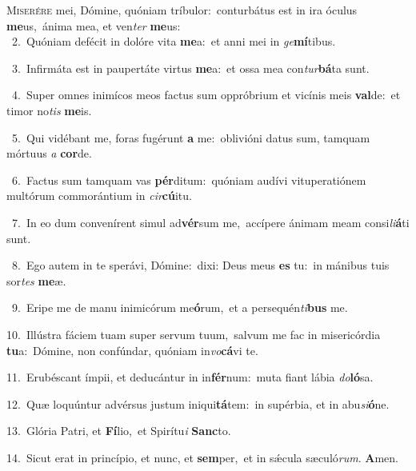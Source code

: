 \lettrine{\initial\textcolor{\initialcolor}{M}}{iserére} mei, Dómine, quóniam tríbulor:~\dagger conturbátus est in ira óculus \textbf{me}\-us,~\star ánima mea, et ven\textit{ter} \textbf{me}\-us:\\
{\numbfont\textcolor{\numbcolor}{~2.}}~Quóniam defécit in dolóre vita \textbf{me}\-a:~\star et anni mei in \textit{ge}\-\textbf{mí}tibus.\par
{\numbfont\textcolor{\numbcolor}{~3.}}~Infirmáta est in paupertáte virtus \textbf{me}\-a:~\star et ossa mea con\-\textit{tur}\-\textbf{bá}ta sunt.\par
{\numbfont\textcolor{\numbcolor}{~4.}}~Super omnes inimícos meos factus sum oppróbrium et vicínis meis \textbf{val}\-de:~\star et timor no\textit{tis} \textbf{me}\-is.\par
{\numbfont\textcolor{\numbcolor}{~5.}}~Qui vidébant me, foras fugérunt \textbf{a} me:~\star oblivióni datus sum, tamquam mórtuus \textit{a} \textbf{cor}\-de.\par
{\numbfont\textcolor{\numbcolor}{~6.}}~Factus sum tamquam vas \textbf{pér}\-ditum:~\star quóniam audívi vituperatiónem multórum commorántium in \textit{cir}\-\textbf{cú}itu.\par
{\numbfont\textcolor{\numbcolor}{~7.}}~In eo dum convenírent simul ad\-\textbf{vér}\-sum me,~\star accípere ánimam meam consi\-\textit{li}\-\textbf{á}ti sunt.\par
{\numbfont\textcolor{\numbcolor}{~8.}}~Ego autem in te sperávi, Dómine:~\dagger dixi: Deus meus \textbf{es} tu:~\star in mánibus tuis sor\textit{tes} \textbf{me}\-æ.\par
{\numbfont\textcolor{\numbcolor}{~9.}}~Eripe me de manu inimicórum me\-\textbf{ó}\-rum,~\star et a persequén\-\textit{ti}\-\textbf{bus} me.\par
{\numbfont\textcolor{\numbcolor}{10.}}~Illústra fáciem tuam super servum tuum,~\dagger salvum me fac in misericórdia \textbf{tu}\-a:~\star Dómine, non confúndar, quóniam in\-\textit{vo}\-\textbf{cá}vi te.\par
{\numbfont\textcolor{\numbcolor}{11.}}~Erubéscant ímpii, et deducántur in in\-\textbf{fér}\-num:~\star muta fiant lábia \textit{do}\-\textbf{ló}sa.\par
{\numbfont\textcolor{\numbcolor}{12.}}~Quæ loquúntur advérsus justum iniqui\-\textbf{tá}\-tem:~\star in supérbia, et in abu\-\textit{si}\-\textbf{ó}ne.\par
{\numbfont\textcolor{\numbcolor}{13.}}~Glória Patri, et \textbf{Fí}\-lio,~\star et Spirítu\textit{i} \textbf{Sanc}\-to.\par
{\numbfont\textcolor{\numbcolor}{14.}}~Sicut erat in princípio, et nunc, et \textbf{sem}\-per,~\star et in sǽcula sæculó\-\textit{rum}\-. \textbf{A}\-men.\par
